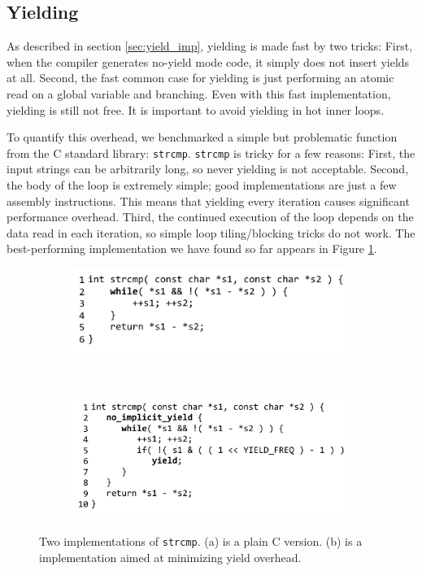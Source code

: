 \documentclass[9pt,preprint]{sigplanconf}
\begin{document}
\subsection{Yielding}

As described in section \ref{sec:yield_imp}, yielding is made fast by two tricks:
First, when the compiler generates no-yield mode code, it simply does not insert yields at all.
Second, the fast common case for yielding is just performing an atomic read on a global variable and branching.
Even with this fast implementation, yielding is still not free.
It is important to avoid yielding in hot inner loops.

To quantify this overhead, we benchmarked a simple but problematic function from the C standard library: \texttt{strcmp}.
\texttt{strcmp} is tricky for a few reasons:
First, the input strings can be arbitrarily long, so never yielding is not acceptable.
Second, the body of the loop is extremely simple; good implementations are just a few assembly instructions.
This means that yielding every iteration causes significant performance overhead.
Third, the continued execution of the loop depends on the data read in each iteration, so simple loop tiling/blocking tricks do not work.
The best-performing implementation we have found so far appears in Figure \ref{fig:strcmp}.

\begin{figure}
    \centering
    \begin{subfigure}[b]{0.3\textwidth}
        \hspace{-1.5cm}
        \includegraphics{plain_strcmp}
        \caption{}
    \end{subfigure}
    ~ %
    \begin{subfigure}[b]{0.3\textwidth}
        \hspace{-1.5cm}
        \includegraphics{strcmp_benchmark}
        \caption{}
    \end{subfigure}
    \caption{Two implementations of \texttt{strcmp}.
      (a) is a plain C version.
      (b) is a \charcoal{} implementation aimed at minimizing yield overhead. }
    \label{fig:strcmp}
\end{figure}
\end{document}
